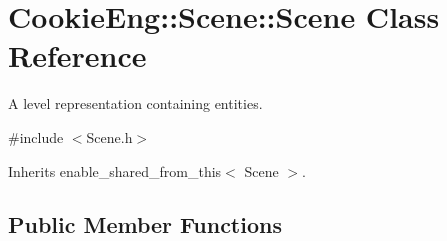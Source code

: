 \hypertarget{class_cookie_eng_1_1_scene_1_1_scene}{}\section{Cookie\+Eng\+:\+:Scene\+:\+:Scene Class Reference}
\label{class_cookie_eng_1_1_scene_1_1_scene}


A level representation containing entities.  




{\ttfamily \#include $<$Scene.\+h$>$}



Inherits enable\+\_\+shared\+\_\+from\+\_\+this$<$ Scene $>$.

\subsection*{Public Member Functions}
